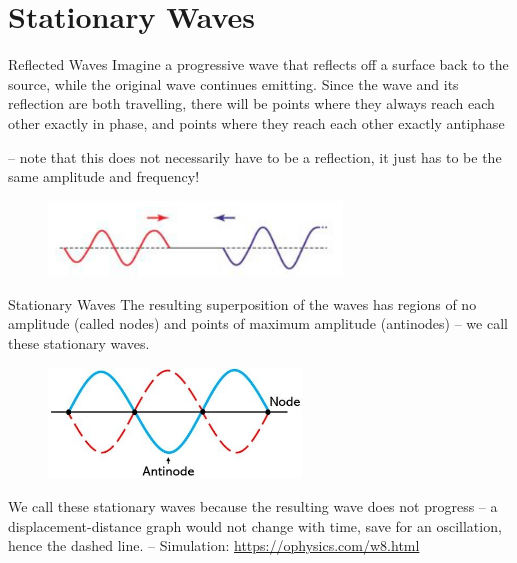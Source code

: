\documentclass[../Main.tex]{subfiles}
\begin{document}
\author{Stationary Waves} %
\date{Year 1 Topic 19} %

\section{Stationary Waves} %

\begin{frame}{Reflected Waves}
    Imagine a progressive wave that reflects off a surface back to the source, while the original wave continues emitting. Since the wave and its reflection are both travelling, there will be points where they always reach each other exactly in phase, and points where they reach each other exactly antiphase \newline 
    
    \newline-- note that this does not necessarily have to be a reflection, it just has to be the same amplitude and frequency!
    \begin{figure}
        \centering
        \includegraphics[height=2cm]{Waves_Images/incomingwaves.jpg}
    \end{figure}
    
\end{frame}

\begin{frame}{Stationary Waves}
    The resulting superposition of the waves has regions of no amplitude (called nodes) and points of maximum amplitude (antinodes) -- we call these stationary waves.
    
    \begin{figure}
        \centering
        \includegraphics[width=0.6\textwidth]{Waves_Images/stationary-wave.jpg}
    \end{figure}
    We call these stationary waves because the resulting wave does not progress -- a displacement-distance graph would not change with time, save for an oscillation, hence the dashed line. \newline
    \newline
    -- Simulation: \url{https://ophysics.com/w8.html}
\end{frame}
\end{document}
